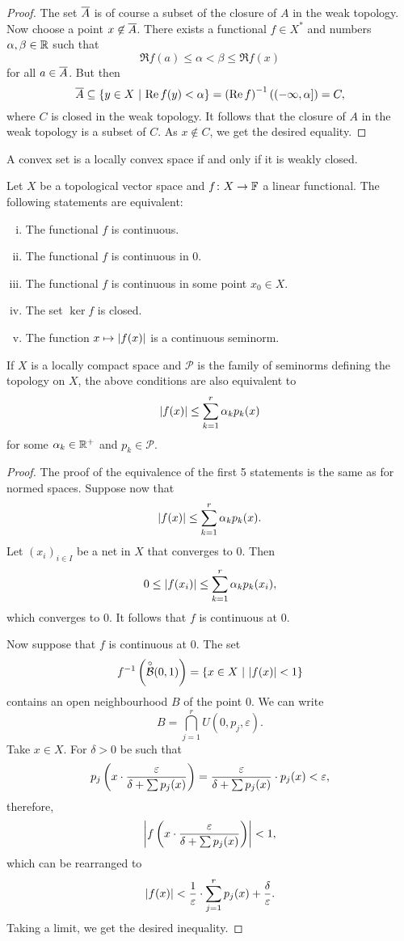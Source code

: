 \begin{proof}
The set $\overline{A}$ is of course a subset of the closure of $A$ in
the weak topology. Now choose a point $x \not \in \overline{A}$. There
exists a functional $f \in X^*$ and numbers $\alpha, \beta \in \mathbb{R}$
such that
\[
\Re f(a) \leq \alpha < \beta \leq \Re f(x)
\]
for all $a \in \overline{A}$. But then
\[
\overline{A} \subseteq
\left\{y \in X~\middle\vert~\operatorname{Re} f(y) < \alpha\right\} =
\left(\operatorname{Re} f\right)^{-1} \left((-\infty, \alpha]\right) =
C,
\]
where $C$ is closed in the weak topology. It follows that the
closure of $A$ in the weak topology is a subset of $C$. As
$x \not \in C$, we get the desired equality.
\end{proof}

\begin{posledica}
A convex set is a locally convex space if and only if it is weakly
closed.
\end{posledica}

\begin{trditev}
Let $X$ be a topological vector space and $f \colon X \to \mathbb{F}$ a
linear functional. The following statements are equivalent:

\begin{enumerate}[i)]
\item The functional $f$ is continuous.
\item The functional $f$ is continuous in $0$.
\item The functional $f$ is continuous in some point $x_0 \in X$.
\item The set $\ker f$ is closed.
\item The function $x \mapsto \left\lvert f(x)\right\rvert$ is a continuous seminorm.
\end{enumerate}

If $X$ is a locally compact space and $\mathcal{P}$ is the family
of seminorms defining the topology on $X$, the above conditions are
also equivalent to
\[
\left\lvert f(x)\right\rvert \leq \sum_{k=1}^r \alpha_k p_k(x)
\]
for some $\alpha_k \in \mathbb{R}^+$ and $p_k \in \mathcal{P}$.
\end{trditev}

\begin{proof}
The proof of the equivalence of the first 5 statements is the same
as for normed spaces. Suppose now that
\[
\left\lvert f(x)\right\rvert \leq \sum_{k=1}^r \alpha_k p_k(x).
\]
Let $(x_i)_{i \in I}$ be a net in $X$ that converges to $0$. Then
\[
0 \leq \left\lvert f(x_i)\right\rvert \leq \sum_{k=1}^r \alpha_k p_k(x_i),
\]
which converges to $0$. It follows that $f$ is continuous at $0$.

Now suppose that $f$ is continuous at $0$. The set
\[
f^{-1} \left(\overset{\circ}{\mathcal{B}}(0, 1)\right) = \left\{x \in X~\middle\vert~\left\lvert f(x)\right\rvert < 1\right\}
\]
contains an open neighbourhood $B$ of the point $0$. We can write
\[
B = \bigcap_{j=1}^r U(0, p_j, \varepsilon).
\]
Take $x \in X$. For $\delta > 0$ be such that
\[
p_j \left(x \cdot \frac{\varepsilon}{\delta + \sum p_j(x)}\right) =
\frac{\varepsilon}{\delta + \sum p_j(x)} \cdot p_j(x) <
\varepsilon,
\]
therefore,
\[
\left\lvert f \left(x \cdot \frac{\varepsilon}{\delta + \sum p_j(x)}\right)\right\rvert < 1,
\]
which can be rearranged to
\[
\left\lvert f(x)\right\rvert <
\frac{1}{\varepsilon} \cdot \sum_{j=1}^r p_j(x) +
\frac{\delta}{\varepsilon}.
\]
Taking a limit, we get the desired inequality.
\end{proof}

